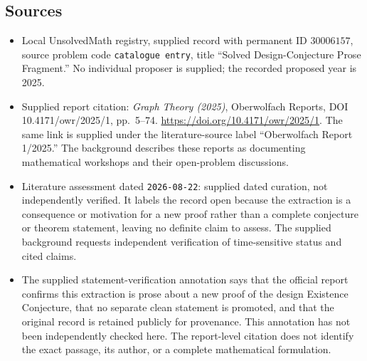 \documentclass[11pt]{article}
\begin{document}
\subsection{Sources}
\begin{itemize}
\item Local UnsolvedMath registry, supplied record with permanent ID \(30006157\), source problem code \texttt{catalogue entry}, title ``Solved Design-Conjecture Prose Fragment.'' No individual proposer is supplied; the recorded proposed year is 2025.
\item Supplied report citation: \emph{Graph Theory (2025)}, Oberwolfach Reports, DOI 10.4171/owr/2025/1, pp.\ 5--74. \url{https://doi.org/10.4171/owr/2025/1}. The same link is supplied under the literature-source label ``Oberwolfach Report 1/2025.'' The background describes these reports as documenting mathematical workshops and their open-problem discussions.
\item Literature assessment dated \texttt{2026-08-22}: supplied dated curation, not independently verified. It labels the record open because the extraction is a consequence or motivation for a new proof rather than a complete conjecture or theorem statement, leaving no definite claim to assess. The supplied background requests independent verification of time-sensitive status and cited claims.
\item The supplied statement-verification annotation says that the official report confirms this extraction is prose about a new proof of the design Existence Conjecture, that no separate clean statement is promoted, and that the original record is retained publicly for provenance. This annotation has not been independently checked here. The report-level citation does not identify the exact passage, its author, or a complete mathematical formulation.
\end{itemize}
\end{document}
